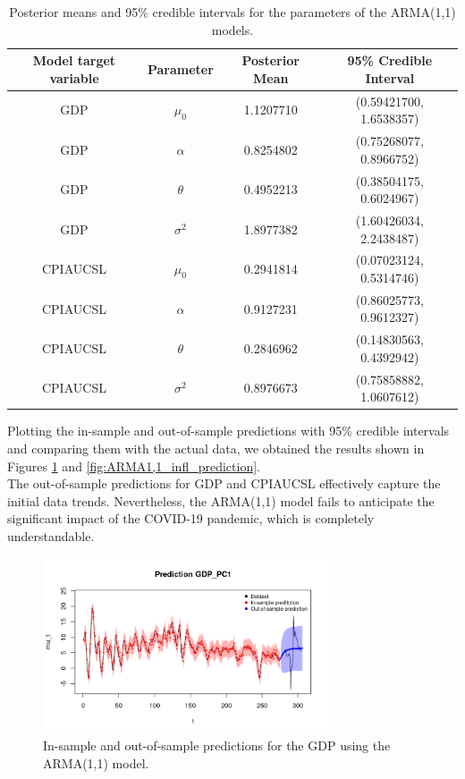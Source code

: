 \begin{table}[H]
    \centering
    \begin{tabular}{|c|c|c|c|}
        \hline
        \textbf{Model target variable } & \textbf{Parameter } & \textbf{Posterior Mean } & \textbf{95\% Credible Interval } \\
        \hline
        GDP      & $\mu_0$    & 1.1207710 & (0.59421700, 1.6538357) \\
        GDP      & $\alpha$   & 0.8254802 & (0.75268077, 0.8966752) \\
        GDP      & $\theta$   & 0.4952213 & (0.38504175, 0.6024967) \\
        GDP      & $\sigma^2$ & 1.8977382 & (1.60426034, 2.2438487) \\
        CPIAUCSL & $\mu_0$    & 0.2941814 & (0.07023124, 0.5314746) \\
        CPIAUCSL & $\alpha$   & 0.9127231 & (0.86025773, 0.9612327) \\
        CPIAUCSL & $\theta$   & 0.2846962 & (0.14830563, 0.4392942) \\
        CPIAUCSL & $\sigma^2$ & 0.8976673 & (0.75858882, 1.0607612) \\
        \hline
    \end{tabular}
    \caption{Posterior means and 95\% credible intervals for the parameters of the ARMA(1,1) models.}
    \label{tab:ARMA1,1_posteriors}
\end{table}
Plotting the in-sample and out-of-sample predictions with 95\% credible intervals and comparing them with the actual data, we obtained the results shown in Figures \ref{fig:ARMA1,1_gdp_prediction} and \ref{fig:ARMA1,1_infl_prediction}. \\
The out-of-sample predictions for GDP and CPIAUCSL effectively capture the initial data trends. Nevertheless, the ARMA(1,1) model fails to anticipate the significant impact of the COVID-19 pandemic, which is completely understandable.
\begin{figure}[H]
    \centering
    \includegraphics[width=0.75\textwidth]{images/4-ARMA/gdp_prediction.png}
    \caption{In-sample and out-of-sample predictions for the GDP using the ARMA(1,1) model.}
    \label{fig:ARMA1,1_gdp_prediction}
\end{figure}
